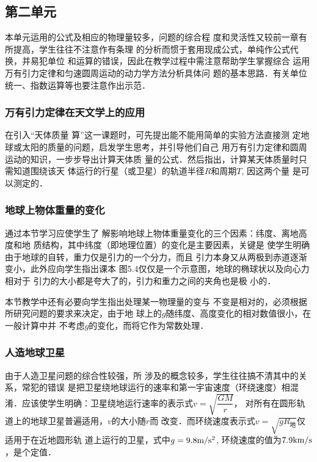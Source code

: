 \subsection{第二单元}
本单元运用的公式及相应的物理量较多，问题的综合程
度和灵活性又较前一章有所提高，学生往往不注意作有条理
的分析而惯于套用现成公式，单纯作公式代换，并易犯单位
和运算的错误，因此在教学过程中需注意帮助学生掌握综合
运用万有引力定律和匀速圆周运动的动力学方法分析具体问
题的基本思路．有关单位统一、指数运算等也要注意作出示范．

\subsubsection{万有引力定律在天文学上的应用} 

在引入“天体质量
算”这一课题时，可先提出能不能用简单的实验方法直接测
定地球或太阳的质量的问题，启发学生思考，并引导他们自己
用万有引力定律和圆周运动的知识，一步步导出计算天体质
量的公式．然后指出，计算某天体质量时只需知道围绕该天
体运行的行星（或卫星）的轨道半径$R$和周期$T$, 因这两个量
是可以测定的．

\subsubsection{地球上物体重量的变化}

通过本节学习应使学生了
解影响地球上物体重量变化的三个因素：纬度、离地高度和地
质结构，其中纬度（即地理位置）的变化是主要因素，关键是
使学生明确由于地球的自转，重力仅是引力的一个分力，而且
引力本身又从两极到赤道逐渐变小，此外应向学生指出课本
图5.4仅仅是一个示意图，地球的椭球状以及向心力相对于
引力的大小都是夸大了的，引力和重力之间的夹角也是极
小的．

本节教学中还有必要向学生指出处理某一物理量的变与
不变是相对的，必须根据所研究问题的要求来决定，由于地
球上的$g$随纬度、高度变化的相对数值很小，在一般计算中并
不考虑$g$的变化，而将它作为常数处理．


\subsubsection{人造地球卫星}

由于人造卫星问题的综合性较强，所
涉及的概念较多，学生往往搞不清其中的关系，常犯的错误
是把卫星绕地球运行的速率和第一宇宙速度（环绕速度）相混
淆．应该使学生明确：卫星绕地运行速率的表示式$v=\sqrt{\dfrac{GM}{r}}$，
对所有在圆形轨道上的地球卫星普遍适用，$v$的大小随$r$而
改变．而环绕速度表示式$v=\sqrt{gR_{\text{地}}}$仅适用于在近地圆形轨
道上运行的卫星，式中$g=9.8\text{m}/\text{s}^2$, 环绕速度的值为$7.9{\rm km/s}$，是个定值．


